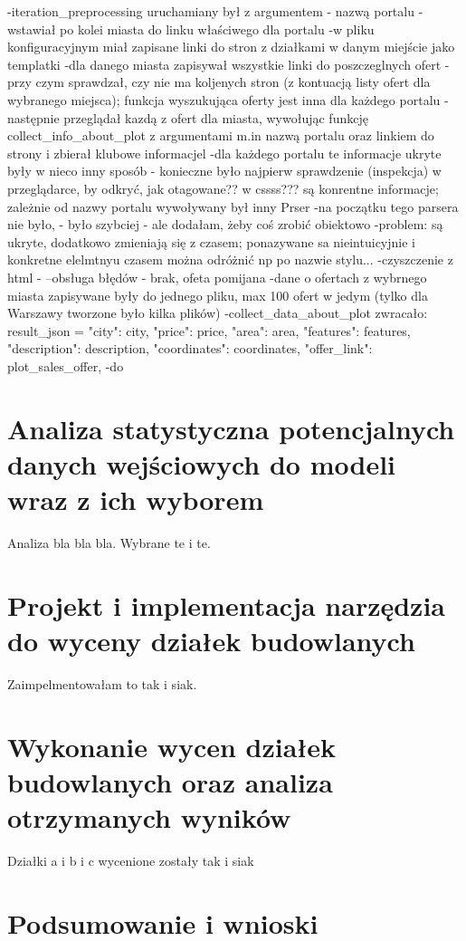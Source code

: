 \documentclass[a4paper,12pt,twoside,openany]{report}
\begin{document}
-iteration_preprocessing uruchamiany był z argumentem - nazwą portalu
-wstawiał po kolei miasta do linku właściwego dla portalu -w pliku konfiguracyjnym miał zapisane linki do stron z działkami w danym miejście jako templatki
-dla danego miasta zapisywał wszystkie linki do poszczeglnych ofert - przy czym sprawdzał, czy nie ma koljenych stron (z kontuacją listy ofert dla wybranego miejsca); funkcja wyszukująca oferty jest inna dla każdego portalu
-następnie przeglądał kazdą z ofert dla miasta, wywołując funkcję collect_info_about_plot z argumentami m.in nazwą portalu oraz linkiem do strony i zbierał klubowe informacjel
-dla każdego portalu te informacje ukryte były w nieco inny sposób - konieczne było najpierw sprawdzenie (inspekcja) w przeglądarce, by odkryć, jak otagowane?? w cssss??? są konrentne informacje; zależnie od nazwy portalu wywoływany był inny Prser
-na początku tego parsera nie było, - było szybciej - ale dodałam, żeby coś zrobić obiektowo 
-problem: są ukryte, dodatkowo zmieniają się z czasem; ponazywane sa nieintuicyjnie i konkretne elelmtnyu czasem można odróżnić np po nazwie stylu...
-czyszczenie z html
-
--obsługa błędów - brak, ofeta pomijana
-dane o ofertach z wybrnego miasta zapisywane były do jednego pliku, max 100 ofert w jedym (tylko dla Warszawy tworzone było kilka plików)
-collect_data_about_plot zwracało:
    result_json = {
        "city": city,
        "price": price,
        "area": area,
        "features": features,
        "description": description,
        "coordinates": coordinates,
        "offer_link": plot_sales_offer,
    }
-do 


\chapter{Analiza statystyczna potencjalnych danych wejściowych do modeli wraz z ich wyborem}
Analiza bla bla bla.
Wybrane te i te.
\chapter{Projekt i implementacja narzędzia do wyceny działek budowlanych}
Zaimpelmentowałam to tak i siak.
\chapter{Wykonanie wycen działek budowlanych oraz analiza otrzymanych wyników}
Działki a i b i c wycenione zostały tak i siak
\chapter{Podsumowanie i wnioski}
\end{document}

